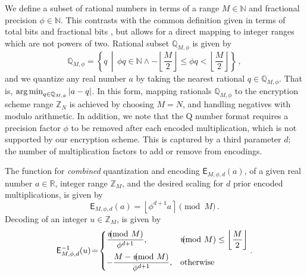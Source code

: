 \documentclass[10pt,letterpaper,oneside,twocolumn,journal]{IEEEtran}
\theoremstyle{definition}
\theoremstyle{definition}
\theoremstyle{remark}
\begin{document}
We define a subset of rational numbers in terms of a range $M \in \mathbb{N}$ and fractional precision $\phi \in \mathbb{N}$. This contrasts with the common definition given in terms of total bits and fractional bits \cite{oberstarFixedPointRepresentationFractional2007,schulzedarupEncryptedCooperativeControl2019,farokhiSecurePrivateControl2017}, but allows for a direct mapping to integer ranges which are not powers of two. Rational subset $\mathbb{Q}_{M,\phi}$ is given by
\begin{equation}
    \mathbb{Q}_{M,\phi} = \left\{q \,\middle|\, \phi q \in \mathbb{N} \wedge -\left\lfloor\frac{M}{2}\right\rfloor \leq \phi q < \left\lfloor\frac{M}{2}\right\rfloor \right\}\,,
\end{equation}
and we quantize any real number $a$ by taking the nearest rational $q \in \mathbb{Q}_{M,\phi}$. That is, $\operatorname*{arg\,min}_{q\in\mathbb{Q}_{M,\phi}} |a-q|$. In this form, mapping rationals $\mathbb{Q}_{M,\phi}$ to the encryption scheme range $\mathbb{Z}_N$ is achieved by choosing $M=N$, and handling negatives with modulo arithmetic. In addition, we note that the Q number format requires a precision factor $\phi$ to be removed after each encoded multiplication, which is not supported by our encryption scheme. This is captured by a third parameter $d$; the number of multiplication factors to add or remove from encodings.

The function for \textit{combined} quantization and encoding $\mathsf{E}_{M,\phi,d}(a)$, of a given real number $a \in \mathbb{R}$, integer range $\mathbb{Z}_M$, and the desired scaling for $d$ prior encoded multiplications, is given by
\begin{equation}
    \mathsf{E}_{M,\phi,d}(a) = \left\lfloor \phi^{d+1} a \right\rceil \pmod{M}\,. \label{eqn:encode}
\end{equation}
Decoding of an integer $u \in \mathbb{Z}_M$, is given by
\begin{equation}
    \mathsf{E}^{-1}_{M,\phi,d}(u) \!=\! 
    \begin{dcases}
        \frac{u\hspace{-8pt}\pmod{M}}{\phi^{d+1}}, &u\hspace{-8pt}\pmod{M} \leq \left\lfloor\frac{M}{2}\right\rfloor \\
        -\frac{M - u\hspace{-8pt}\pmod{M}}{\phi^{d+1}}, &\text{otherwise} \\
    \end{dcases}.\label{eqn:decode}
\end{equation}
\end{document}

